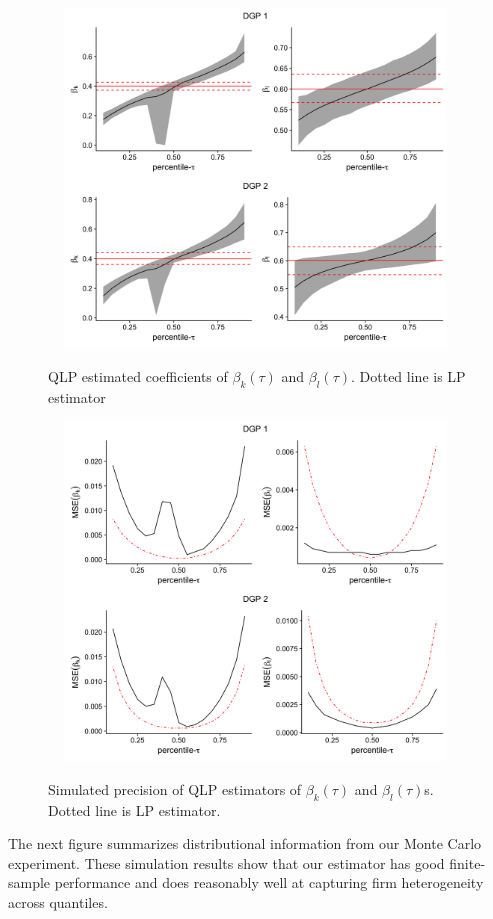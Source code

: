 \documentclass[11pt]{article}
\begin{document}
\begin{figure}[H]
\centering
\caption{QLP estimated coefficients of  $\beta_{k}(\tau)$ and $\beta_{l}(\tau)$. Dotted line is LP estimator}
\includegraphics[width=11cm, height=9cm]{LP_Coefficient_Plot.png}
\label{LP_coefficient_plot}
\end{figure}


\begin{figure}[H]
\centering
\caption{Simulated precision of  QLP estimators of $\beta_{k}(\tau)$ and $\beta_{l}(\tau)$s. Dotted line is LP estimator.}
\includegraphics[width=11cm, height=9cm]{LP_MSE_Plot.png}
\label{MSE_plot}
\end{figure}


The next figure summarizes distributional information from our Monte Carlo experiment. These simulation results show that our estimator has good finite-sample performance and does reasonably well at capturing firm heterogeneity across quantiles.
\end{document}
